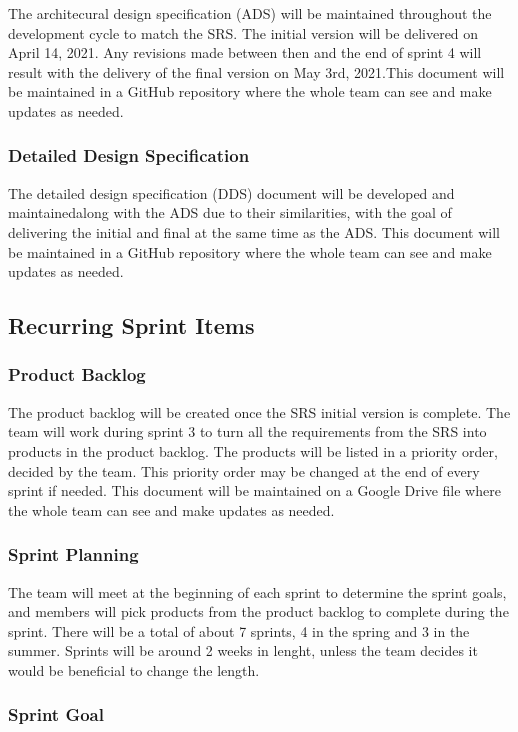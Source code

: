 The architecural design specification (ADS) will be maintained throughout the development cycle to match the SRS. The initial version will be delivered on April 14, 2021. Any revisions made between then and the end of sprint 4 will result with the delivery of the final version on May 3rd, 2021.This document will be maintained in a GitHub repository where the whole team can see and make updates as needed.

\subsubsection{Detailed Design Specification}

The detailed design specification (DDS) document will be developed and maintainedalong with the ADS due to their similarities, with the goal of delivering the initial and final at the same time as the ADS. This document will be maintained in a GitHub repository where the whole team can see and make updates as needed.
\subsection{Recurring Sprint Items}

\subsubsection{Product Backlog}
The product backlog will be created once the SRS initial version is complete. The team will work during sprint 3 to turn all the requirements from the SRS into products in the product backlog. The products will be listed in a priority order, decided by the team. This priority order may be changed at the end of every sprint if needed. This document will be maintained on a Google Drive file where the whole team can see and make updates as needed.

\subsubsection{Sprint Planning}

The team will meet at the beginning of each sprint to determine the sprint goals, and members will pick products from the product backlog to complete during the sprint. There will be a total of about 7 sprints, 4 in the spring and 3 in the summer. Sprints will be around 2 weeks in lenght, unless the team decides it would be beneficial to change the length.

\subsubsection{Sprint Goal}


